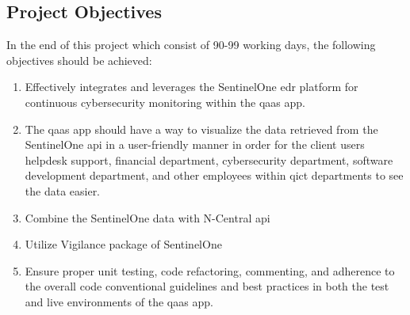 \begin{multicols}{2}
      \section{Project Objectives}
      In the end of this project which consist of 90-99 working days, the following objectives should be achieved:
      \begin{enumerate}
            \item Effectively integrates and leverages the SentinelOne \acrshort{edr} platform for continuous
                  cybersecurity monitoring within the \acrshort{qaas} app.
            \item The \acrshort{qaas} app should have a way to visualize the data retrieved from the SentinelOne
                  \acrshort{api} in a user-friendly manner in order for the client users helpdesk support, financial
                  department, cybersecurity department, software development department, and other employees within
                  \acrshort{qict}  departments to see the data easier.
            \item Combine the SentinelOne data with N-Central \acrshort{api}
            \item Utilize Vigilance package of SentinelOne
            \item Ensure proper unit testing, code refactoring, commenting, and adherence to the overall code
                  conventional guidelines and best practices in both the test and live environments of the
                  \acrshort{qaas} app.
      \end{enumerate}

\end{multicols}
